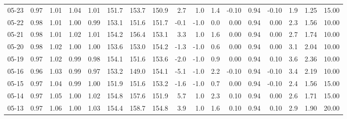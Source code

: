 \begin{threeparttable}
{\begin{tabular}{lrrrrrrrrrrrrrrrr}
  05-23 &         0.97 &           1.01 &          1.04 &          1.01 & 151.7 & 153.7 & 150.9 &        2.7 &                      1.0 &                 1.4 &      -0.10 &      0.94 &          -0.10 &              1.9 &            1.25 &                  15.00 \\
  05-22 &         0.98 &           1.01 &          1.00 &          0.99 & 153.1 & 151.6 & 151.7 &       -0.1 &                     -1.0 &                 0.0 &       0.00 &      0.94 &           0.00 &              2.3 &            1.56 &                  10.00 \\
  05-21 &         0.98 &           1.01 &          1.02 &          1.01 & 154.2 & 156.4 & 153.1 &        3.3 &                      1.0 &                 1.6 &       0.00 &      0.94 &           0.00 &              2.7 &            1.74 &                  10.00 \\
  05-20 &         0.98 &           1.02 &          1.00 &          1.00 & 153.6 & 153.0 & 154.2 &       -1.3 &                     -1.0 &                 0.6 &       0.00 &      0.94 &           0.00 &              3.1 &            2.04 &                  10.00 \\
  05-19 &         0.97 &           1.02 &          0.99 &          0.98 & 154.1 & 151.6 & 153.6 &       -2.0 &                     -1.0 &                 0.9 &       0.00 &      0.94 &           0.10 &              3.6 &            2.36 &                  10.00 \\
  05-16 &         0.96 &           1.03 &          0.99 &          0.97 & 153.2 & 149.0 & 154.1 &       -5.1 &                     -1.0 &                 2.2 &      -0.10 &      0.94 &          -0.10 &              3.4 &            2.19 &                  10.00 \\
  05-15 &         0.97 &           1.04 &          0.99 &          1.00 & 151.9 & 151.6 & 153.2 &       -1.6 &                     -1.0 &                 0.7 &       0.00 &      0.94 &          -0.10 &              2.4 &            1.56 &                  15.00 \\
  05-14 &         0.97 &           1.05 &          1.00 &          1.02 & 154.8 & 157.6 & 151.9 &        5.7 &                      1.0 &                 2.3 &       0.10 &      0.94 &           0.00 &              2.6 &            1.71 &                  15.00 \\
  05-13 &         0.97 &           1.06 &          1.00 &          1.03 & 154.4 & 158.7 & 154.8 &        3.9 &                      1.0 &                 1.6 &       0.10 &      0.94 &           0.10 &              2.9 &            1.90 &                  20.00 \\

\end{tabular}}
\end{threeparttable}
